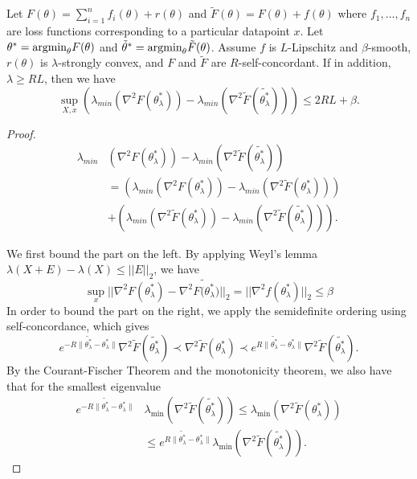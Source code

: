 \begin{theorem}\label{thm: gs_lambda}
	Let $F(\theta) = \sum_{i=1}^n f_i(\theta) +  r(\theta)$ and $\tilde{F}(\theta) = F(\theta) + f(\theta)$ where  $f_1,...,f_n$ are  loss functions corresponding to a particular datapoint $x$.  
	Let $\theta^* = \text{argmin}_\theta F(\theta)$ and $\tilde{\theta}^* = \text{argmin}_\theta \tilde{F}(\theta)$. Assume $f$ is $L$-Lipschitz and $\beta$-smooth, $r(\theta)$ is $\lambda$-strongly convex, and $F$ and $\tilde{F}$ are $R$-self-concordant. If in addition, $\lambda \geq  RL$, then we have
	$$
	\sup_{X,x} (\lambda_{min}(\nabla^2F(\theta_\lambda^*)) -\lambda_{min}(\nabla^2\tilde{F}(\tilde{\theta_\lambda^*})))   \leq   2RL + \beta.
	$$
\end{theorem}
\begin{proof}

\begin{equation}\label{eq:GS_lamb_min_deriv1}
    \begin{split}
 \lambda_{min}&(\nabla^2F(\theta_\lambda^*)) -\lambda_{min}(\nabla^2\tilde{F}(\tilde{\theta_\lambda^*})) \\
 &= (\lambda_{min}(\nabla^2F(\theta_\lambda^*)) -\lambda_{min}(\nabla^2\tilde{F}(\theta_\lambda^*)))  \\&+ (\lambda_{min}(\nabla^2\tilde{F}(\theta_\lambda^*)) -\lambda_{min}(\nabla^2\tilde{F}(\tilde{\theta_\lambda^*}))). 
    \end{split}
\end{equation}

We first bound the part on the left.
By applying Weyl's lemma $\lambda(X+E)-\lambda(X) \leq ||E||_2$,
we have 
\begin{equation}\label{eq:GS_lamb_min_deriv2}
 \sup_{x}||\nabla^2F(\theta_\lambda^*) - \nabla^2\tilde{F(\theta_\lambda^*})||_2 = ||\nabla^2 f(\theta_\lambda^*)||_2 \leq \beta
\end{equation}
In order to bound the part on the right, we apply the semidefinite ordering  using self-concordance, which gives 
$$
e^{-R\|\tilde{\theta_\lambda^*} - \theta_\lambda^*\|} \nabla^2\tilde{F}(\tilde{\theta_\lambda^*})\prec \nabla^2\tilde{F}(\theta_\lambda^*) \prec e^{R\|\tilde{\theta_\lambda^*} - \theta_\lambda^*\|} \nabla^2\tilde{F}(\tilde{\theta_\lambda^*}).
$$
By the Courant-Fischer Theorem and the monotonicity theorem, we also have that for the smallest eigenvalue
\begin{equation}
\label{eq:GS_lamb_min_deriv3}
\begin{split}
e^{-R\|\tilde{\theta_\lambda^*} - \theta_\lambda^*\|} &  \lambda_{\min}\left(\nabla^2\tilde{F}(\tilde{\theta_\lambda^*})\right)  \leq    \lambda_{\min}\left(\nabla^2\tilde{F}(\theta_\lambda^*) \right) \\&\leq e^{R\|\tilde{\theta_\lambda^*} - \theta_\lambda^*\|}   \lambda_{\min}\left(\nabla^2\tilde{F}(\tilde{\theta_\lambda^*})\right).
\end{split}
\end{equation}


\end{proof}
